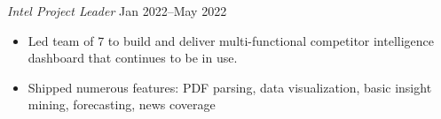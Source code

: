 \textit{Intel Project Leader} \hfill Jan 2022--May 2022
\begin{itemize}
	\item Led team of 7 to build and deliver multi-functional competitor intelligence dashboard that continues to be in use.
	\item Shipped numerous features: PDF parsing, data visualization, basic insight mining, forecasting, news coverage
\end{itemize}\par